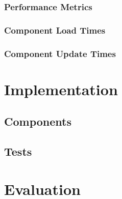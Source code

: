 \documentclass[a4paper, fontsize=11pt]{article}
\begin{document}
\subsubsection{Performance Metrics}
% 

\subsubsection{Component Load Times}
% 

\subsubsection{Component Update Times}
% 

\section{Implementation}\label{sec:implementation}
\subsection{Components}\label{subsec:components}
% 
\subsection{Tests}\label{subsec:tests}
% 

\section{Evaluation}\label{sec:evaluation}
\end{document}
